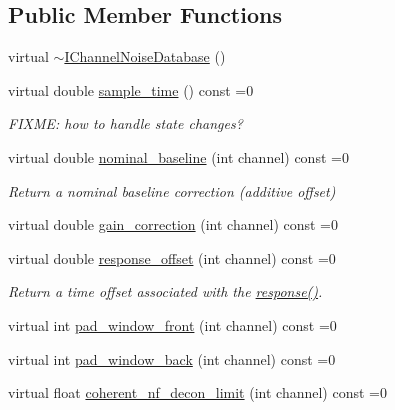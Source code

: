 \subsection*{Public Member Functions}
\begin{DoxyCompactItemize}
\item 
virtual \hyperlink{class_wire_cell_1_1_i_channel_noise_database_a997b922519e63f2c7e98ea6a2ee3c858}{$\sim$\+I\+Channel\+Noise\+Database} ()
\item 
virtual double \hyperlink{class_wire_cell_1_1_i_channel_noise_database_a82406ba30d65412db34e038e789be95c}{sample\+\_\+time} () const =0
\begin{DoxyCompactList}\small\item\em F\+I\+X\+ME\+: how to handle state changes? \end{DoxyCompactList}\item 
virtual double \hyperlink{class_wire_cell_1_1_i_channel_noise_database_a253f602c70bddb7986e63dc14b8d8e6e}{nominal\+\_\+baseline} (int channel) const =0
\begin{DoxyCompactList}\small\item\em Return a nominal baseline correction (additive offset) \end{DoxyCompactList}\item 
virtual double \hyperlink{class_wire_cell_1_1_i_channel_noise_database_ad2cdf46aea4ac11f8b7d097bd19c2e80}{gain\+\_\+correction} (int channel) const =0
\item 
virtual double \hyperlink{class_wire_cell_1_1_i_channel_noise_database_a5a1d081b5cd6d32ac7209b99eb2c61dc}{response\+\_\+offset} (int channel) const =0
\begin{DoxyCompactList}\small\item\em Return a time offset associated with the \hyperlink{class_wire_cell_1_1_i_channel_noise_database_ad3c42f59a26e8a8e115199a894d881da}{response()}. \end{DoxyCompactList}\item 
virtual int \hyperlink{class_wire_cell_1_1_i_channel_noise_database_a77f82280942595e1a2506f49a6f76f56}{pad\+\_\+window\+\_\+front} (int channel) const =0
\item 
virtual int \hyperlink{class_wire_cell_1_1_i_channel_noise_database_a4d772c3ba5f7071a2d869264f37dfecc}{pad\+\_\+window\+\_\+back} (int channel) const =0
\item 
virtual float \hyperlink{class_wire_cell_1_1_i_channel_noise_database_af1b0da30d4aa280deca52a84a9a6326d}{coherent\+\_\+nf\+\_\+decon\+\_\+limit} (int channel) const =0

\end{DoxyCompactItemize}
